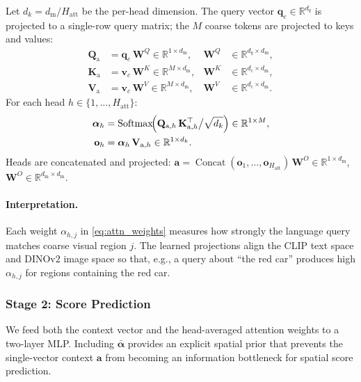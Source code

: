 \documentclass[11pt,a4paper]{article}
\DeclareMathOperator{\Softmax}{Softmax}
\DeclareMathOperator{\Concat}{Concat}
\newcommand{\R}{\mathbb{R}}
\newcommand{\vv}{\mathbf{v}}
\newcommand{\vq}{\mathbf{q}}
\begin{document}
\begin{mathbox}[title={Cross-Attention Computation}]
Let $d_k = d_{\mathrm{m}} / H_{\mathrm{att}}$ be the per-head dimension. The
query vector $\vq_e\in\R^{d_q}$ is projected to a single-row query matrix; the
$M$ coarse tokens are projected to keys and values:
\begin{align}
  \mathbf{Q}_{\mathrm{a}} &= \vq_e\,\mathbf{W}^Q
    \in\R^{1\times d_{\mathrm{m}}},
  & \mathbf{W}^Q &\in\R^{d_q\times d_{\mathrm{m}}},
  \label{eq:q_proj} \\
  \mathbf{K}_{\mathrm{a}} &= \vv_c\,\mathbf{W}^K
    \in\R^{M\times d_{\mathrm{m}}},
  & \mathbf{W}^K &\in\R^{d_c\times d_{\mathrm{m}}},
  \label{eq:k_proj} \\
  \mathbf{V}_{\mathrm{a}} &= \vv_c\,\mathbf{W}^V
    \in\R^{M\times d_{\mathrm{m}}},
  & \mathbf{W}^V &\in\R^{d_c\times d_{\mathrm{m}}}.
  \label{eq:v_proj}
\end{align}
For each head $h\in\{1,\ldots,H_{\mathrm{att}}\}$:
\begin{align}
  \boldsymbol{\alpha}_h
    &= \Softmax\!\Bigl(
      \mathbf{Q}_{\mathrm{a},h}\,\mathbf{K}_{\mathrm{a},h}^\top
      \big/\sqrt{d_k}
    \Bigr) \in\R^{1\times M},
  \label{eq:attn_weights} \\
  \mathbf{o}_h
    &= \boldsymbol{\alpha}_h\,\mathbf{V}_{\mathrm{a},h}
    \in\R^{1\times d_k}.
  \label{eq:attn_out}
\end{align}
Heads are concatenated and projected:
$\mathbf{a} = \Concat(\mathbf{o}_1,\ldots,\mathbf{o}_{H_{\mathrm{att}}})
\,\mathbf{W}^O \in\R^{1\times d_{\mathrm{m}}}$,
$\mathbf{W}^O\in\R^{d_{\mathrm{m}}\times d_{\mathrm{m}}}$.
\end{mathbox}

\paragraph{Interpretation.} Each weight $\alpha_{h,j}$ in \cref{eq:attn_weights}
measures how strongly the language query matches coarse visual region $j$. The
learned projections align the CLIP text space and DINOv2 image space so that,
e.g., a query about ``the red car'' produces high $\alpha_{h,j}$ for regions
containing the red car.

\subsubsection{Stage 2: Score Prediction}
\label{subsubsec:score_head}

We feed both the context vector and the head-averaged attention weights to a
two-layer MLP. Including $\bar{\boldsymbol{\alpha}}$ provides an explicit spatial
prior that prevents the single-vector context $\mathbf{a}$ from becoming an
information bottleneck for spatial score prediction.
\end{document}
